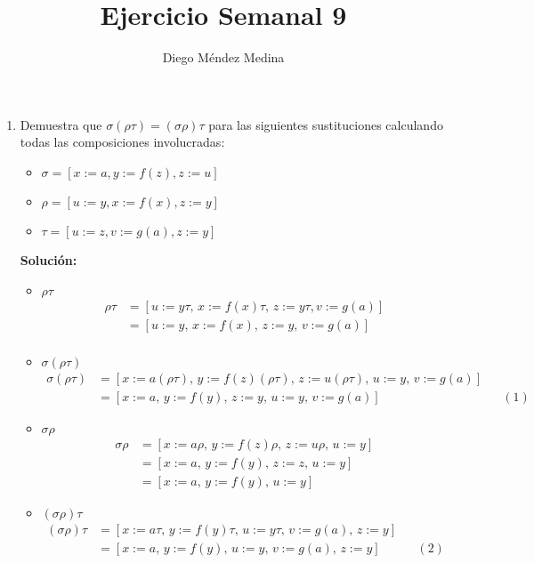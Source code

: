 \documentclass[8pt, letterpaper]{article}
\title{%
  Ejercicio Semanal 9\\
  {\large{}}}
\author{Diego Méndez Medina}
\date{}
\begin{document}
\ttfamily
\maketitle
\rmfamily

\begin{enumerate}
\item Demuestra que $\sigma(\rho\tau) = (\sigma\rho)\tau$ para las siguientes
  sustituciones calculando todas las composiciones involucradas:
  \begin{itemize}
  \item $\sigma = [x:= a, y:= f(z), z:= u]$
  \item $\rho = [u:=y, x := f(x), z:= y]$
  \item $\tau = [u:= z, v:= g(a), z:= y]$
  \end{itemize}

  {\bf Solución:}

  \begin{itemize}
  \item $\rho\tau$
  \begin{align*}
    \rho\tau &= [u:=y\tau,\, x := f(x)\tau,\, z:= y\tau, v:= g(a)]\\
    &= [u:=y,\, x := f(x),\, z:= y,\, v:= g(a)]\\
  \end{align*}
  \item $\sigma(\rho\tau)$
  \begin{align*}
    \sigma(\rho\tau) &= [x:= a(\rho\tau),\, y:= f(z)(\rho\tau),\,
      z:= u(\rho\tau),\, u:= y,\, v:= g(a)]\\
    &= [x:= a,\, y:= f(y),\,z:= y,\, u:= y,\,v:= g(a)] & &(1)
  \end{align*}
\item $\sigma\rho$
  \begin{align*}
    \sigma\rho &= [x:= a\rho,\, y:= f(z)\rho,\, z:= u\rho,\, u:= y]\\
    &= [x:= a,\, y:= f(y),\, z:= z,\, u:= y]\\
    &= [x:= a,\, y:= f(y),\, u:= y]
  \end{align*}
\item $(\sigma\rho)\tau$
  \begin{align*}
    (\sigma\rho)\tau &= [x:= a\tau,\, y:= f(y)\tau,\, u:= y\tau,\,
      v:= g(a),\, z:= y]\\
    &= [x:= a,\, y:= f(y),\, u:= y,\, v:= g(a),\, z:= y] & &(2)
  \end{align*}
  \end{itemize}
  

\end{enumerate}
\end{document}
